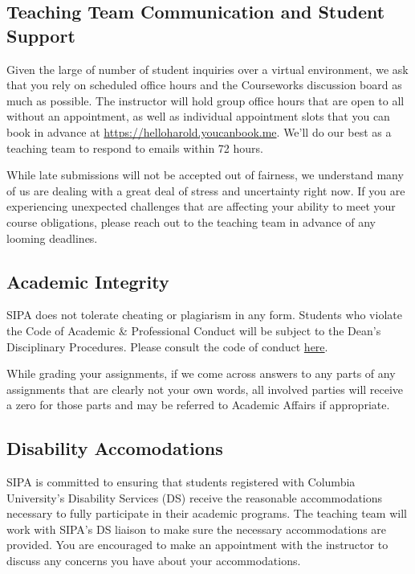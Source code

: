 \documentclass[11pt,]{article}
\begin{document}
\hypertarget{teaching-team-communication-and-student-support}{%
\subsection{Teaching Team Communication and Student
Support}\label{teaching-team-communication-and-student-support}}

Given the large of number of student inquiries over a virtual
environment, we ask that you rely on scheduled office hours and the
Courseworks discussion board as much as possible. The instructor will
hold group office hours that are open to all without an appointment, as
well as individual appointment slots that you can book in advance at
\url{https://helloharold.youcanbook.me}. We'll do our best as a teaching
team to respond to emails within 72 hours.

While late submissions will not be accepted out of fairness, we
understand many of us are dealing with a great deal of stress and
uncertainty right now. If you are experiencing unexpected challenges
that are affecting your ability to meet your course obligations, please
reach out to the teaching team in advance of any looming deadlines.

\hypertarget{academic-integrity}{%
\subsection{Academic Integrity}\label{academic-integrity}}

SIPA does not tolerate cheating or plagiarism in any form. Students who
violate the Code of Academic \& Professional Conduct will be subject to
the Dean's Disciplinary Procedures. Please consult the code of conduct
\href{http://bulletin.columbia.edu/sipa/academic-policies/discipline-procedures/index.html}{here}.

While grading your assignments, if we come across answers to any parts
of any assignments that are clearly not your own words, all involved
parties will receive a zero for those parts and may be referred to
Academic Affairs if appropriate.

\hypertarget{disability-accomodations}{%
\subsection{Disability Accomodations}\label{disability-accomodations}}

SIPA is committed to ensuring that students registered with Columbia
University's Disability Services (DS) receive the reasonable
accommodations necessary to fully participate in their academic
programs. The teaching team will work with SIPA's DS liaison to make
sure the necessary accommodations are provided. You are encouraged to
make an appointment with the instructor to discuss any concerns you have
about your accommodations.
\end{document}
